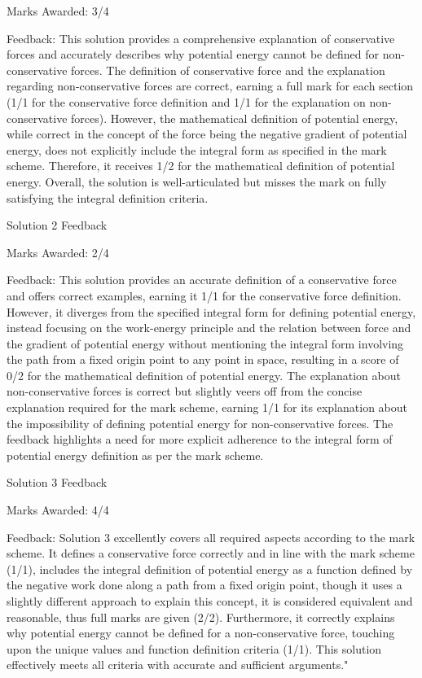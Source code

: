 \documentclass[a4paper,11pt]{article}
\begin{document}
Marks Awarded: 3/4

Feedback: This solution provides a comprehensive explanation of conservative forces and accurately describes why potential energy cannot be defined for non-conservative forces. The definition of conservative force and the explanation regarding non-conservative forces are correct, earning a full mark for each section (1/1 for the conservative force definition and 1/1 for the explanation on non-conservative forces). However, the mathematical definition of potential energy, while correct in the concept of the force being the negative gradient of potential energy, does not explicitly include the integral form as specified in the mark scheme. Therefore, it receives 1/2 for the mathematical definition of potential energy. Overall, the solution is well-articulated but misses the mark on fully satisfying the integral definition criteria.

Solution 2 Feedback

Marks Awarded: 2/4

Feedback: This solution provides an accurate definition of a conservative force and offers correct examples, earning it 1/1 for the conservative force definition. However, it diverges from the specified integral form for defining potential energy, instead focusing on the work-energy principle and the relation between force and the gradient of potential energy without mentioning the integral form involving the path from a fixed origin point to any point in space, resulting in a score of 0/2 for the mathematical definition of potential energy. The explanation about non-conservative forces is correct but slightly veers off from the concise explanation required for the mark scheme, earning 1/1 for its explanation about the impossibility of defining potential energy for non-conservative forces. The feedback highlights a need for more explicit adherence to the integral form of potential energy definition as per the mark scheme.

Solution 3 Feedback

Marks Awarded: 4/4

Feedback: Solution 3 excellently covers all required aspects according to the mark scheme. It defines a conservative force correctly and in line with the mark scheme (1/1), includes the integral definition of potential energy as a function defined by the negative work done along a path from a fixed origin point, though it uses a slightly different approach to explain this concept, it is considered equivalent and reasonable, thus full marks are given (2/2). Furthermore, it correctly explains why potential energy cannot be defined for a non-conservative force, touching upon the unique values and function definition criteria (1/1). This solution effectively meets all criteria with accurate and sufficient arguments."
\end{document}
